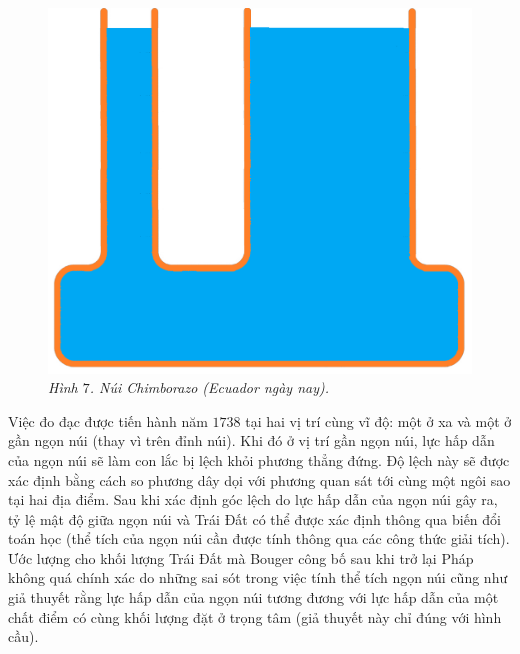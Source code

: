 \begin{multicols}{2}
\begin{figure}[H]
		\includegraphics[width =1\linewidth]{8}
		\caption{\small\textit{\color{timhieukhoahoc}Hình $7$. Núi Chimborazo (Ecuador ngày nay).}}
		\vspace*{-10pt}
	\end{figure}
	Việc đo đạc được tiến hành năm $1738$ tại hai vị trí cùng vĩ độ: một ở xa và một ở gần ngọn núi (thay vì trên đỉnh núi). Khi đó ở vị trí gần ngọn núi, lực hấp dẫn của ngọn núi sẽ làm con lắc bị lệch khỏi phương thẳng đứng. Độ lệch này sẽ được xác định bằng cách so phương dây dọi với phương quan sát tới cùng một ngôi sao tại hai địa điểm. Sau khi xác định góc lệch do lực hấp dẫn của ngọn núi gây ra, tỷ lệ mật độ giữa ngọn núi và Trái Đất có thể được xác định thông qua biến đổi toán học (thể tích của ngọn núi cần được tính thông qua các công thức giải tích). Ước lượng cho khối lượng Trái Đất mà Bouger công bố sau khi trở lại Pháp không quá chính xác do những sai sót trong việc tính thể tích ngọn núi cũng như giả thuyết rằng lực hấp dẫn của ngọn núi tương đương với lực hấp dẫn của một chất điểm có cùng khối lượng đặt ở trọng tâm (giả thuyết này chỉ đúng với hình cầu).
	\begin{figure}[H]
		\vspace*{-5pt}
		\centering
		\captionsetup{labelformat= empty, justification=centering}

\end{figure}
\end{multicols}

